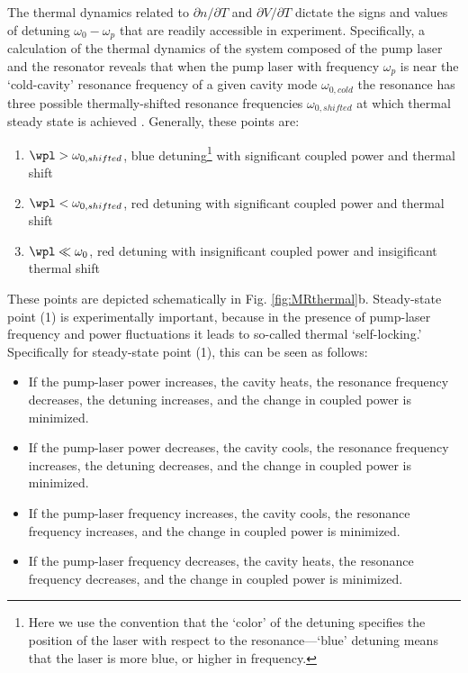 The thermal dynamics related to $\partial n/\partial T$ and $\partial V/\partial T$ dictate the signs and values of detuning $\omega_0-\omega_p$ that are readily accessible in experiment. Specifically, a calculation of the thermal dynamics of the system composed of the pump laser and the resonator reveals that when the pump laser with frequency $\omega_p$ is near the `cold-cavity' resonance frequency of a given cavity mode $\omega_{0,cold}$ the resonance has three possible thermally-shifted resonance frequencies $\omega_{0,shifted}$ at which thermal steady state is achieved \cite{Carmon2004}. Generally, these points are:
\begin{enumerate}
\item $\wpl>\omega_{0,shifted}$, blue detuning\footnote{Here we use the convention that the `color' of the detuning specifies the position of the laser with respect to the resonance---`blue' detuning means that the laser is more blue, or higher in frequency.} with significant coupled power and thermal shift
\item $\wpl<\omega_{0,shifted}$, red detuning with significant coupled power and thermal shift
\item $\wpl\ll\omega_{0}$, red detuning with insignificant coupled power and insigificant thermal shift
\end{enumerate}
These points are depicted schematically in Fig. \ref{fig:MRthermal}b. Steady-state point (1) is experimentally important, because in the presence of pump-laser frequency and power fluctuations it leads to so-called thermal `self-locking.' Specifically for steady-state point (1), this can be seen as follows: 
\begin{itemize}
	\item If the pump-laser power increases, the cavity heats, the resonance frequency decreases, the detuning increases, and the change in coupled power is minimized.
	\item If the pump-laser power decreases, the cavity cools, the resonance frequency increases, the detuning decreases, and the change in coupled power is minimized.
	\item If the pump-laser frequency increases, the cavity cools, the resonance frequency increases, and the change in coupled power is minimized.
	\item If the pump-laser frequency decreases, the cavity heats, the resonance frequency decreases, and the change in coupled power is minimized.
	\end{itemize}
